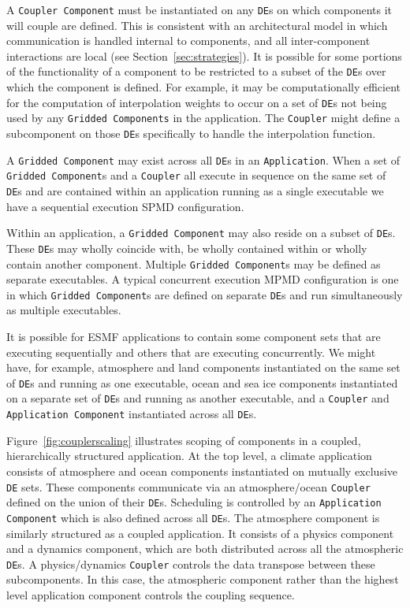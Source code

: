 A {\tt Coupler Component} must be instantiated on any {\tt DE}s on which components
it will couple are defined.  This is consistent with an architectural
model in which communication is handled internal to components, and all
inter-component interactions are local (see Section~\ref{sec:strategies}).  
It is possible for
some portions of the functionality of a component to be restricted to
a subset of the {\tt DE}s over which the component is defined.  For example, 
it may be computationally efficient for the computation of interpolation
weights to occur on a set of {\tt DE}s not being used by any {\tt Gridded 
Components}
in the application.  The {\tt Coupler} might define a subcomponent on 
those {\tt DE}s specifically to handle the interpolation function.

A {\tt Gridded Component} may exist across all {\tt DE}s in an {\tt Application}.  
When a set of {\tt Gridded  Component}s and a {\tt Coupler} all execute in sequence on 
the same set of {\tt DE}s and are contained within an application running 
as a single executable we have a sequential execution SPMD configuration.  

Within an application, a {\tt Gridded Component} may also reside on 
a subset of {\tt DE}s.  These {\tt DE}s may wholly coincide with, be wholly 
contained within or wholly contain another component.  Multiple {\tt Gridded 
Component}s may be defined as separate executables.  A typical 
concurrent execution MPMD configuration is one in which {\tt Gridded Component}s 
are defined on separate {\tt DE}s and run simultaneously as multiple 
executables.  

It is possible for ESMF applications to contain some component sets
that are executing sequentially and others that are executing concurrently.
We might have, for example, atmosphere and land components instantiated 
on the same set of 
{\tt DE}s and running as one executable, ocean and sea ice 
components instantiated on a separate set of {\tt DE}s and running as 
another executable, and a {\tt Coupler} and {\tt Application Component} 
instantiated across all {\tt DE}s.

Figure~\ref{fig:couplerscaling} illustrates scoping of components
in a coupled, hierarchically structured application.  At the top level, 
a climate application consists of atmosphere and ocean components 
instantiated on mutually exclusive {\tt DE} sets.  These components communicate 
via an atmosphere/ocean {\tt Coupler} defined on the union of their {\tt DE}s.  
Scheduling is controlled by an {\tt Application
Component} which is also defined across all {\tt DE}s.  The atmosphere component
is similarly structured as a coupled application.  It consists of a 
physics component and a dynamics component, which are both distributed
across all the atmospheric {\tt DE}s.  A physics/dynamics {\tt Coupler} controls
the data transpose between these subcomponents.  In this case, the
atmospheric component rather than the highest level application component
controls the coupling sequence.  

